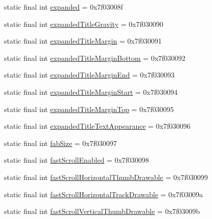 \begin{DoxyCompactItemize}
static final int \mbox{\hyperlink{classandroid_1_1support_1_1design_1_1R_1_1attr_a8b2f1952a1f1858370c55b77a5c8fdf0}{expanded}} = 0x7f03008f
\item 
static final int \mbox{\hyperlink{classandroid_1_1support_1_1design_1_1R_1_1attr_af9227f3d0dd94b70bf8560495793ef46}{expanded\+Title\+Gravity}} = 0x7f030090
\item 
static final int \mbox{\hyperlink{classandroid_1_1support_1_1design_1_1R_1_1attr_aa82f302d274ae27a8c9353fadca028c8}{expanded\+Title\+Margin}} = 0x7f030091
\item 
static final int \mbox{\hyperlink{classandroid_1_1support_1_1design_1_1R_1_1attr_a3eab7e6efce6d1e0bab6faf32ed77c76}{expanded\+Title\+Margin\+Bottom}} = 0x7f030092
\item 
static final int \mbox{\hyperlink{classandroid_1_1support_1_1design_1_1R_1_1attr_ad547616c8f37d753a16d55b3af437504}{expanded\+Title\+Margin\+End}} = 0x7f030093
\item 
static final int \mbox{\hyperlink{classandroid_1_1support_1_1design_1_1R_1_1attr_a117547f2f75572ed87f35bf8d2174c3c}{expanded\+Title\+Margin\+Start}} = 0x7f030094
\item 
static final int \mbox{\hyperlink{classandroid_1_1support_1_1design_1_1R_1_1attr_ab480074094d112513cccb460ca7d08ce}{expanded\+Title\+Margin\+Top}} = 0x7f030095
\item 
static final int \mbox{\hyperlink{classandroid_1_1support_1_1design_1_1R_1_1attr_a0093d7cf21b5718aa96f111e023ca986}{expanded\+Title\+Text\+Appearance}} = 0x7f030096
\item 
static final int \mbox{\hyperlink{classandroid_1_1support_1_1design_1_1R_1_1attr_ae50af000a6d2566abf822dd923f0e6bc}{fab\+Size}} = 0x7f030097
\item 
static final int \mbox{\hyperlink{classandroid_1_1support_1_1design_1_1R_1_1attr_ab90b19f698fc461d6fecd4a55436a4a4}{fast\+Scroll\+Enabled}} = 0x7f030098
\item 
static final int \mbox{\hyperlink{classandroid_1_1support_1_1design_1_1R_1_1attr_aa59487a99a0e8e5ebc17ac91c211adcd}{fast\+Scroll\+Horizontal\+Thumb\+Drawable}} = 0x7f030099
\item 
static final int \mbox{\hyperlink{classandroid_1_1support_1_1design_1_1R_1_1attr_a7cf786e9baedda04c832d33839504397}{fast\+Scroll\+Horizontal\+Track\+Drawable}} = 0x7f03009a
\item 
static final int \mbox{\hyperlink{classandroid_1_1support_1_1design_1_1R_1_1attr_af1cb6f60b39eb79ccb79c25746af2f64}{fast\+Scroll\+Vertical\+Thumb\+Drawable}} = 0x7f03009b

\end{DoxyCompactItemize}
